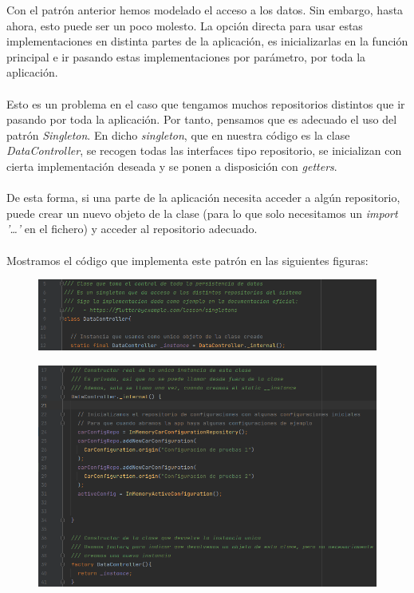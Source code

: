 Con el patrón anterior hemos modelado el acceso a los datos. Sin embargo, hasta ahora, esto puede ser un poco molesto. La opción directa para usar estas implementaciones en distinta partes de la aplicación, es inicializarlas en la función principal e ir pasando estas implementaciones por parámetro, por toda la aplicación.
\\\\
Esto es un problema en el caso que tengamos muchos repositorios distintos que ir pasando por toda la aplicación. Por tanto, pensamos que es adecuado el uso del patrón \emph{Singleton}. En dicho \emph{singleton}, que en nuestra código es la clase \emph{DataController}, se recogen todas las interfaces tipo repositorio, se inicializan con cierta implementación deseada y se ponen a disposición con \emph{getters}.
\\\\
De esta forma, si una parte de la aplicación necesita acceder a algún repositorio, puede crear un nuevo objeto de la clase (para lo que solo necesitamos un \emph{import '\ldots'} en el fichero) y acceder al repositorio adecuado.
\\\\
Mostramos el código que implementa este patrón en las siguientes figuras:

\begin{figure}[H]
    \centering
    \includegraphics[scale=0.6]{imagenes/ds-singleton1.png}
\end{figure}
\begin{figure}[H]
    \centering
    \includegraphics[scale=0.6]{imagenes/ds-singleton2.png}
\end{figure}

